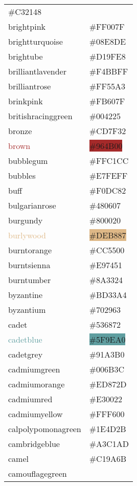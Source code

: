 \documentclass[
]{article}
\begin{document}
\begin{longtable}[]{@{}ll@{}}
\colorbox{brightmaroon}{\#C32148}\tabularnewline
\textcolor{brightpink}{brightpink} &
\colorbox{brightpink}{\#FF007F}\tabularnewline
\textcolor{brightturquoise}{brightturquoise} &
\colorbox{brightturquoise}{\#08E8DE}\tabularnewline
\textcolor{brightube}{brightube} &
\colorbox{brightube}{\#D19FE8}\tabularnewline
\textcolor{brilliantlavender}{brilliantlavender} &
\colorbox{brilliantlavender}{\#F4BBFF}\tabularnewline
\textcolor{brilliantrose}{brilliantrose} &
\colorbox{brilliantrose}{\#FF55A3}\tabularnewline
\textcolor{brinkpink}{brinkpink} &
\colorbox{brinkpink}{\#FB607F}\tabularnewline
\textcolor{britishracinggreen}{britishracinggreen} &
\colorbox{britishracinggreen}{\#004225}\tabularnewline
\textcolor{bronze}{bronze} & \colorbox{bronze}{\#CD7F32}\tabularnewline
\textcolor{brown}{brown} & \colorbox{brown}{\#964B00}\tabularnewline
\textcolor{bubblegum}{bubblegum} &
\colorbox{bubblegum}{\#FFC1CC}\tabularnewline
\textcolor{bubbles}{bubbles} &
\colorbox{bubbles}{\#E7FEFF}\tabularnewline
\textcolor{buff}{buff} & \colorbox{buff}{\#F0DC82}\tabularnewline
\textcolor{bulgarianrose}{bulgarianrose} &
\colorbox{bulgarianrose}{\#480607}\tabularnewline
\textcolor{burgundy}{burgundy} &
\colorbox{burgundy}{\#800020}\tabularnewline
\textcolor{burlywood}{burlywood} &
\colorbox{burlywood}{\#DEB887}\tabularnewline
\textcolor{burntorange}{burntorange} &
\colorbox{burntorange}{\#CC5500}\tabularnewline
\textcolor{burntsienna}{burntsienna} &
\colorbox{burntsienna}{\#E97451}\tabularnewline
\textcolor{burntumber}{burntumber} &
\colorbox{burntumber}{\#8A3324}\tabularnewline
\textcolor{byzantine}{byzantine} &
\colorbox{byzantine}{\#BD33A4}\tabularnewline
\textcolor{byzantium}{byzantium} &
\colorbox{byzantium}{\#702963}\tabularnewline
\textcolor{cadet}{cadet} & \colorbox{cadet}{\#536872}\tabularnewline
\textcolor{cadetblue}{cadetblue} &
\colorbox{cadetblue}{\#5F9EA0}\tabularnewline
\textcolor{cadetgrey}{cadetgrey} &
\colorbox{cadetgrey}{\#91A3B0}\tabularnewline
\textcolor{cadmiumgreen}{cadmiumgreen} &
\colorbox{cadmiumgreen}{\#006B3C}\tabularnewline
\textcolor{cadmiumorange}{cadmiumorange} &
\colorbox{cadmiumorange}{\#ED872D}\tabularnewline
\textcolor{cadmiumred}{cadmiumred} &
\colorbox{cadmiumred}{\#E30022}\tabularnewline
\textcolor{cadmiumyellow}{cadmiumyellow} &
\colorbox{cadmiumyellow}{\#FFF600}\tabularnewline
\textcolor{calpolypomonagreen}{calpolypomonagreen} &
\colorbox{calpolypomonagreen}{\#1E4D2B}\tabularnewline
\textcolor{cambridgeblue}{cambridgeblue} &
\colorbox{cambridgeblue}{\#A3C1AD}\tabularnewline
\textcolor{camel}{camel} & \colorbox{camel}{\#C19A6B}\tabularnewline
\textcolor{camouflagegreen}{camouflagegreen} &

\end{longtable}
\end{document}
